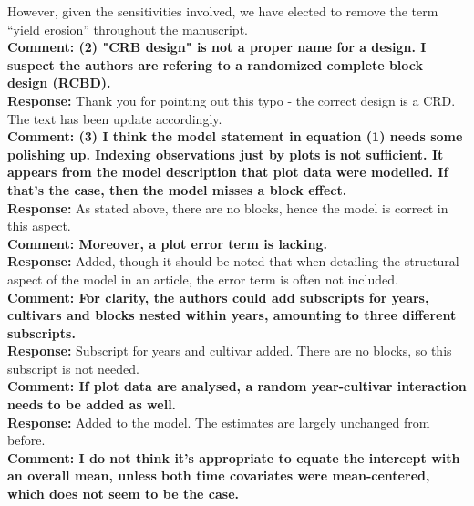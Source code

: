 \documentclass{article} \usepackage[margin=1in]{geometry}
\begin{document}
However, given the sensitivities involved, we have elected to 
remove the term ``yield erosion'' throughout the manuscript.\\

\textbf{Comment: (2) "CRB design" is not a proper name for a design. I suspect the
  authors are refering to a randomized complete block design (RCBD).}\\

\textbf{Response:} Thank you for pointing out this typo - the correct
design is a CRD. The text has been update accordingly.\\

\textbf{Comment: (3) I think the model statement in equation (1) needs some polishing
  up. Indexing observations just by plots is not sufficient. It appears
  from the model description that plot data were modelled. If that's the
  case, then the model misses a block effect.}\\

\textbf{Response:} As stated above, there are no blocks, hence the
model is correct in this aspect.\\

\textbf{Comment: Moreover, a plot error term is lacking.}\\

\textbf{Response:} Added, though it should be noted that when detailing
the structural aspect of the model in an article, the error term is often
not included. \\

\textbf{Comment: For clarity, the authors could add subscripts for
  years, cultivars and blocks nested within years, amounting to three
  different subscripts.}\\

\textbf{Response:} Subscript for years and cultivar added. There are
no blocks, so this subscript is not needed.\\

\textbf{Comment: If plot data are analysed, a random year-cultivar interaction
  needs to be added as well.}\\

\textbf{Response:} Added to the model. The estimates are largely
unchanged from before.\\

\textbf{Comment: I do not think
  it's appropriate to equate the intercept with an overall mean, unless
  both time covariates were mean-centered, which does not seem to be the
  case.}\\
\end{document}
